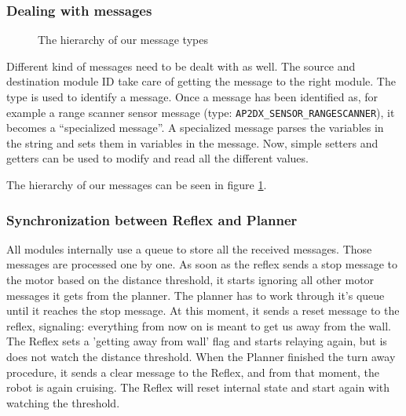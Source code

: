\subsubsection{Dealing with messages}
\begin{figure}
\centerline{
}
\caption{The hierarchy of our message types}
\label{fig:messageHierarchy}
\end{figure}
Different kind of messages need to be dealt with as well. The source and destination module ID take care
of getting the message to the right module. The type is used to identify a message. Once a message
has been identified as, for example a range scanner sensor message (type:
\texttt{AP2DX\_SENSOR\_RANGESCANNER}), 
it becomes a ``specialized message''. 
A specialized message parses the variables in the string and sets them in variables in the message. Now,
simple setters and getters can be used to modify and read all the different
values.

The hierarchy of our messages can be seen in figure \ref{fig:messageHierarchy}. 


\subsubsection{Synchronization between Reflex and Planner}
All modules internally use a queue to store all the received messages. Those messages are processed one by one. As soon as the reflex sends a stop message to the motor based on the distance threshold, it starts ignoring all other motor messages it gets from the planner. The planner has to work through it's queue until it reaches the stop message. At this moment, it sends a reset message to the reflex, signaling: everything from now on is meant to get us away from the wall. The Reflex sets a 'getting away from wall' flag and starts relaying again, but is does not watch the distance threshold. When the Planner finished the turn away procedure, it sends a clear message to the Reflex, and from that moment, the robot is again cruising. The Reflex will reset internal state and start again with watching the threshold.
